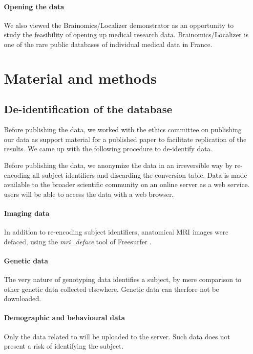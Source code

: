 \documentclass[review]{elsarticle}
\begin{document}
\paragraph{Opening the data} We also viewed the Brainomics/Localizer demonstrator
as an opportunity  to study the feasibility of opening up medical research data.
Brainomics/Localizer is one of the rare public databases of individual medical
data in France.


\section{Material and methods}

\subsection{De-identification of the database}

Before publishing the data, we worked with the ethics committee on publishing our
data as support material for a published paper \cite{Pinel2012} to facilitate
replication of the results. We came up with the following procedure to de-identify data.

Before publishing the data, we anonymize the data in an irreversible way by
re-encoding all subject identifiers and discarding the conversion table. Data
is made available to the broader scientific community on an online server as
a web service. users will be able to access the data with a web browser.

\paragraph{Imaging data} In addition to re-encoding subject identifiers,
anatomical MRI images were defaced, using the \textit{mri\_deface} tool of
Freesurfer \cite{Fischl2012}.

\paragraph{Genetic data} The very nature of genotyping data identifies a subject,
by mere comparison to other genetic data collected elsewhere. Genetic data can
therfore not be downloaded.

\paragraph{Demographic and behavioural data} Only the data related to \cite{Pinel2007}
will be uploaded to the server. Such data does not present a risk of identifying the subject.
\end{document}
